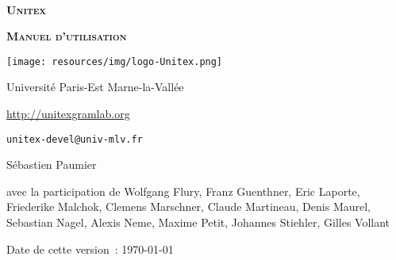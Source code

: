 
\begin{titlepage}
\begin{center}

~

\vspace{3cm}
\Huge
\textsc{\textbf{Unitex \UnitexVersion{}}}

\vspace{1cm}

\huge
\textsc{\textbf{Manuel d'utilisation}}

\vspace{2cm}

  \begin{center}
    \texttt{[image: resources/img/logo-Unitex.png]}
  \end{center}
\normalsize

\vspace{2cm}

\LARGE

Université Paris-Est Marne-la-Vallée
\bigskip
\normalsize

\url{http://unitexgramlab.org}

\verb$unitex-devel@univ-mlv.fr$

\vspace{1cm}

Sébastien Paumier
\bigskip

avec la participation de Wolfgang Flury, Franz Guenthner, Eric Laporte,\\
Friederike Malchok, Clemens Marschner, Claude Martineau, Denis Maurel,\\
Sebastian Nagel, Alexis Neme, Maxime Petit, Johannes Stiehler, Gilles Vollant\\
\bigskip

\mydate
Date de cette version~: \today
\end{center}

\end{titlepage}
